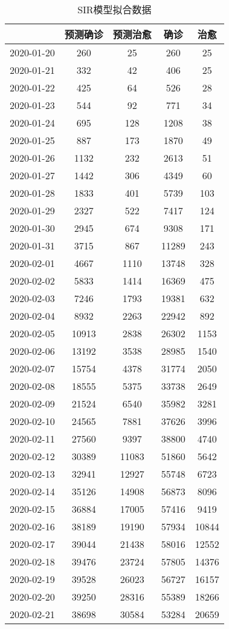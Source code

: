 \begin{longtable}{ccccc}
\caption{SIR模型拟合数据}\\
\hline
&预测确诊&预测治愈&确诊&治愈\\
\hline
2020-01-20&260&25&260&25\\
2020-01-21&332&42&406&25\\
2020-01-22&425&64&526&28\\
2020-01-23&544&92&771&34\\
2020-01-24&695&128&1208&38\\
2020-01-25&887&173&1870&49\\
2020-01-26&1132&232&2613&51\\
2020-01-27&1442&306&4349&60\\
2020-01-28&1833&401&5739&103\\
2020-01-29&2327&522&7417&124\\
2020-01-30&2945&674&9308&171\\
2020-01-31&3715&867&11289&243\\
2020-02-01&4667&1110&13748&328\\
2020-02-02&5833&1414&16369&475\\
2020-02-03&7246&1793&19381&632\\
2020-02-04&8932&2263&22942&892\\
2020-02-05&10913&2838&26302&1153\\
2020-02-06&13192&3538&28985&1540\\
2020-02-07&15754&4378&31774&2050\\
2020-02-08&18555&5375&33738&2649\\
2020-02-09&21524&6540&35982&3281\\
2020-02-10&24565&7881&37626&3996\\
2020-02-11&27560&9397&38800&4740\\
2020-02-12&30389&11083&51860&5642\\
2020-02-13&32941&12927&55748&6723\\
2020-02-14&35126&14908&56873&8096\\
2020-02-15&36884&17005&57416&9419\\
2020-02-16&38189&19190&57934&10844\\
2020-02-17&39044&21438&58016&12552\\
2020-02-18&39476&23724&57805&14376\\
2020-02-19&39528&26023&56727&16157\\
2020-02-20&39250&28316&55389&18266\\
2020-02-21&38698&30584&53284&20659\\

\end{longtable}

